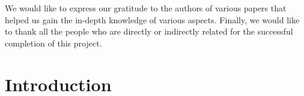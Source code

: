 \par
We would like to express our gratitude to the authors of various papers that helped us gain the in-depth knowledge of various aspects. Finally, we would like to thank all the people who are directly or indirectly related for the successful completion of this project.

\begin{flushright}
\vskip -20pt
\submittedBy
\end{flushright}

{
\KECadjusttocspacings %
\makeatletter
\def\@makeschapterhead#1{%
  {\newpage \parindent \z@ \raggedright
    \normalfont
    \interlinepenalty\@M
    \center \fontsize{16pt}{1} \bfseries \MakeUppercase{#1}\par\nobreak
    \vskip 18\p@ %
  }}
\makeatother 

\tableofcontents %

\cleardoublepage
{}
\listoffigures
}

\KECloa %


\newpage
{} %

\chapter{Introduction}

